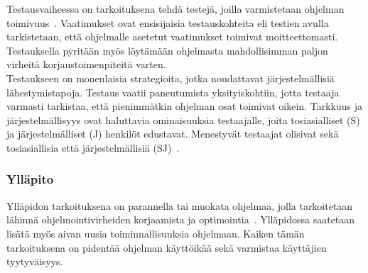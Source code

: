 \documentclass[finnish]{../tktltiki2}
\theoremstyle{definition}
\theoremstyle{remark}
\begin{document}
Testausvaiheessa on tarkoituksena tehdä testejä, joilla varmistetaan ohjelman toimivuus~\cite{SWEBOK:409902}. Vaatimukset ovat ensisijaisia
testauskohteita eli testien avulla tarkistetaan, että ohjelmalle asetetut vaatimukset toimivat
moitteettomasti. Testauksella pyritään myös löytämään ohjelmasta mahdollisimman paljon virheitä korjaustoimenpiteitä varten.\\



Testaukseen on monenlaisia strategioita, jotka noudattavat järjestelmälli\-siä lähestymistapoja. Testaus vaatii paneutumista yksityiskohtiin, jotta testaaja varmasti tarkistaa, että pienimmätkin ohjelman osat toimivat oikein. Tarkkuus ja järjestelmällisyys ovat
haluttavia ominaisuuksia testaajalle, joita tosiasialliset (S) ja järjestelmälliset (J) henkilöt edustavat. Menestyvät testaajat olisivat sekä tosiasiallisia että järjestelmällisiä (SJ)~\cite{Capretz:2010:MSS:1726559.1726574}.

\subsubsection{Ylläpito}

Ylläpidon
tarkoituksena on parannella tai muokata ohjelmaa, jolla tarkoitetaan lähinnä ohjelmointivirheiden
korjaamista ja optimointia~\cite{SWEBOK:409902}. Ylläpidossa saatetaan lisätä myös aivan uusia toiminnallisuuksia
ohjelmaan. Kaiken tämän tarkoituksena on pidentää ohjelman käyttöikää sekä varmistaa käyt\-täjien
tyytyväisyys.\\
\end{document}
